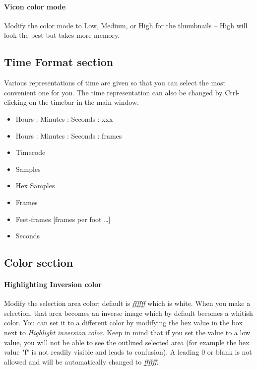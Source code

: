 \paragraph{Vicon color mode}  Modify the color mode to Low, Medium, or High for the thumbnails -- High will look the best but takes more memory.

\subsection{Time Format section}%
\label{sub:time_format_section}

Various representations of time are given so that you can select the most convenient one for you. The time representation can also be changed by Ctrl-clicking on the timebar in the main window.

\begin{itemize}[noitemsep]
    \item Hours : Minutes : Seconds : xxx
    \item Hours : Minutes : Seconds : frames
    \item Timecode
    \item Samples
    \item Hex Samples
    \item Frames
    \item Feet-frames  [frames per foot \dots]
    \item Seconds
\end{itemize}

\subsection{Color section}%
\label{sub:color_section}


\paragraph{Highlighting Inversion color}  Modify the selection area color; default is \textit{ffffff} which is white. When you make a selection, that area becomes an inverse image which by default becomes a whitish color.  You can set it to a different color by modifying the hex value in the box next to \textit{Highlight inversion color}.   Keep in mind that if you set the value to a low value, you will not be able to see the outlined selected area (for example the hex value "f" is not readily visible and leads to confusion).  A leading 0 or blank is not allowed and will be automatically changed to \textit{ffffff}.
